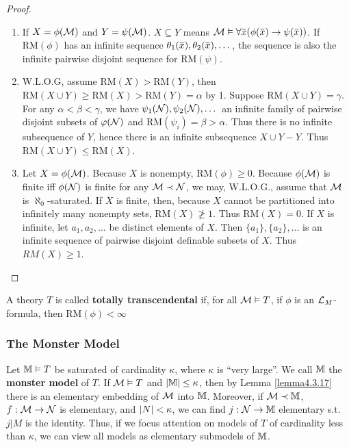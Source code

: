 \documentclass[11pt]{article}
\def \RM {\text{RM}}
\begin{document}
\begin{proof}
\begin{enumerate}
\item If \(X=\phi(\mathcal{M})\) and \(Y=\psi(\mathcal{M})\). \(X\subseteq Y\) means \(\calm\vDash\forall \barx(\phi(\barx)\to\psi(\barx))\). If \(\RM(\phi)\) has an
 infinite sequence \(\theta_1(\barx),\theta_2(\barx),\dots\), the sequence is also the infinite pairwise
disjoint sequence for \(\RM(\psi)\).
\item W.L.O.G, assume \(\RM(X)>\RM(Y)\), then \(\RM(X\cup Y)\ge\RM(X)>\RM(Y)=\alpha\) by 1.
Suppose \(\RM(X\cup Y)=\gamma\). For any \(\alpha<\beta<\gamma\), we have \(\psi_1(\mathcal{N}),\psi_2(\mathcal{N}),\dots\) an infinite family of
pairwise disjoint subsets of \(\varphi(\mathcal{N})\) and \(\RM(\psi_i)=\beta>\alpha\). Thus there is no infinite
subsequence of \(Y\), hence there is an infinite subsequence \(X\cup Y-Y\). Thus \(\RM(X\cup Y)\le \RM(X)\).
\item Let \(X=\phi(\mathcal{M})\). Because \(X\) is nonempty, \(\RM(\phi)\ge 0\). Because \(\phi(\mathcal{M})\) is finite
iff \(\phi(\mathcal{N})\) is finite for any \(\mathcal{M}\prec\mathcal{N}\), we may, W.L.O.G., assume that \(\mathcal{M}\)
is \(\aleph_0\)-saturated. If \(X\) is finite, then, because \(X\) cannot be partitioned into
infinitely many nonempty sets, \(\RM(X)\not\ge 1\). Thus \(\RM(X)=0\). If \(X\) is infinite,
let \(a_1,a_2,\dots\) be distinct elements of \(X\). Then
\(\{a_1\},\{a_2\},\dots\) is an infinite sequence of pairwise disjoint definable subsets of \(X\).
Thus \(RM(X)\ge 1\).
\end{enumerate}
\end{proof}

\begin{definition}[]
A theory \(T\) is called \textbf{totally transcendental} if, for all \(\mathcal{M}\vDash T\), if \(\phi\) is
an \(\mathcal{L}_M\)-formula, then \(\RM(\phi)<\infty\)
\end{definition}
\subsubsection{The Monster Model}
\label{sec:org8a83e5e}
Let \(\mathbb{M}\vDash T\) be saturated of cardinality \(\kappa\), where \(\kappa\) is ``very large''. We call \(\mathbb{M}\) the \textbf{monster
model} of \(T\). If \(\mathcal{M}\vDash T\) and \(\abs{\M}\le\kappa\), then by Lemma \ref{lemma4.3.17} there is an
elementary embedding of \(\mathcal{M}\) into \(\mathbb{M}\). Moreover, if \(\mathcal{M}\prec\mathbb{M}\), \(f:\mathcal{M}\to\mathcal{N}\) is elementary,
and \(\abs{N}<\kappa\), we can find \(j:\mathcal{N}\to\mathbb{M}\) elementary s.t. \(j|M\) is the identity. Thus, if we
focus attention on models of \(T\) of cardinality less than \(\kappa\), we can view all models as
elementary submodels of \(\mathbb{M}\).
\end{document}
